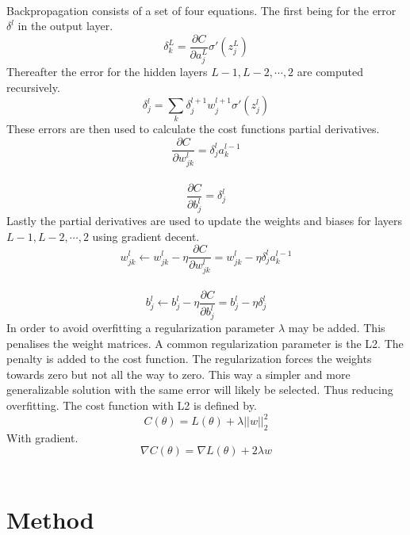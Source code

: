 \documentclass[12pt, letterpaper, twoside]{article}
\begin{document}
\ \\
Backpropagation consists of a set of four equations. The first being for the error $\delta^l$ in the output layer.\\
$$
\delta_k^L = \frac{\partial C}{\partial a_j^L}\sigma'(z_j^L)
$$
Thereafter the error for the hidden layers $L-1, L-2,\cdots,2$ are computed recursively.\\
$$
\delta_j^l = \sum_k \delta_j^{l+1} w_j^{l+1} \sigma'(z_j^{l})
$$
These errors are then used to calculate the cost functions partial derivatives.\\
$$
\frac{\partial C}{\partial w_{jk}^{l}} = \delta_j^l a_k^{l-1}
$$
\ \\
$$
\frac{\partial C}{\partial b_j^l} = \delta_j^l
$$
Lastly the partial derivatives are used to update the weights and biases for layers $L-1,L-2,\cdots,2$ using gradient decent.\\
$$
w_{jk}^l \leftarrow w_{jk}^l - \eta \frac{\partial C}{\partial w_{jk}^l}
= w_{jk}^l - \eta \delta_j^l a_{k}^{l-1}
$$
\ \\
$$
b_j^l \leftarrow b_j^l - \eta \frac{\partial C}{\partial b_j^l}
= b_j^l - \eta \delta_j^l
$$
In order to avoid overfitting a regularization parameter $\lambda$ may be added. This penalises the weight matrices. A common regularization parameter is the L2. The penalty is added to the cost function. The regularization forces the weights towards zero but not all the way to zero. This way a simpler and more generalizable solution with the same error will likely be selected. Thus reducing overfitting. The cost function with L2 is defined by.
$$
C(\theta) = L(\theta) + \lambda||w||_2^2
$$
With gradient.
$$
\nabla C(\theta) = \nabla L(\theta) + 2 \lambda w
$$
\ \\
\section{Method}
\end{document}
